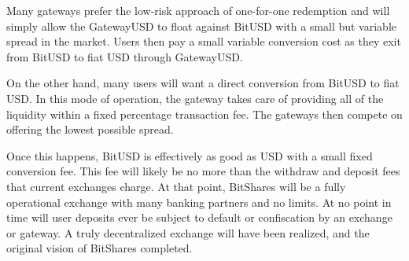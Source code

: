 \label{sec:gateway}

Many gateways prefer the low-risk approach of one-for-one redemption and will
simply allow the GatewayUSD to float against BitUSD with a small but variable
spread in the market. Users then pay a small variable conversion cost as they
exit from BitUSD to fiat USD through GatewayUSD.

On the other hand, many users will want a direct conversion from BitUSD to fiat
USD. In this mode of operation, the gateway takes care of providing all of the
liquidity within a fixed percentage transaction fee. The gateways then
compete on offering the lowest possible spread.

Once this happens, BitUSD is effectively as good as USD with a small fixed
conversion fee. This fee will likely be no more than the withdraw and deposit
fees that current exchanges charge. At that point, BitShares will be a fully
operational exchange with many banking partners and no limits. At no point in
time will user deposits ever be subject to default or confiscation by an
exchange or gateway. A truly decentralized exchange will have been realized,
and the original vision of BitShares completed.
